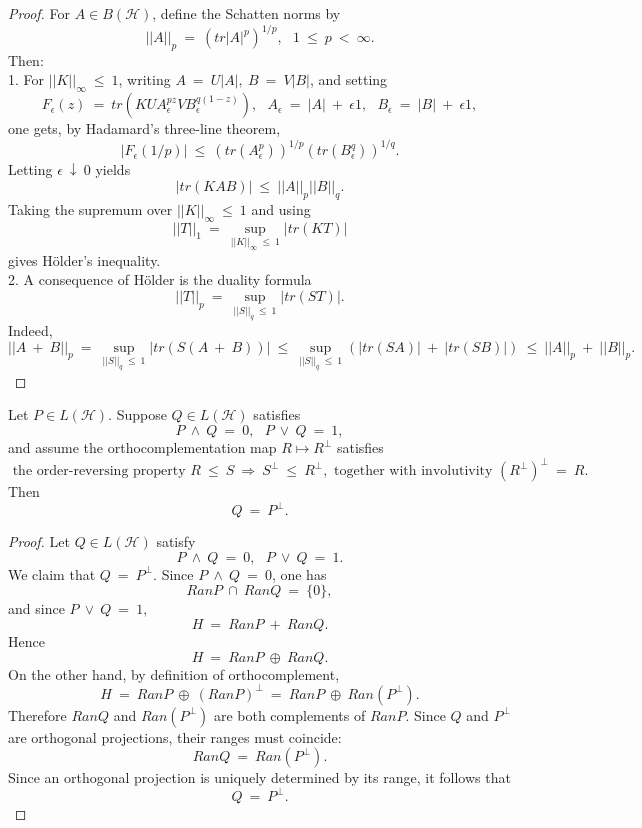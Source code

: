 \documentclass[11pt,a4paper]{article}
\begin{document}
    \vspace{0.3cm} %
    \begin{proof}
    For $A \in B(\mathcal{H})$, define the Schatten norms by $$||A||_p\ =\ (tr|A|^p)^{1/p},\ \ \ 1\ \leq\ p\ <\ \infty.$$ Then:\\
    1. For $||K||_\infty\ \leq\ 1$, writing $A\ =\ U|A|,\ B\ =\ V|B|$, and setting $$F_\epsilon(z)\ =\ tr(KUA_\epsilon^{pz}VB_\epsilon^{q(1-z)}),\ \ \ A_\epsilon\ =\ |A|\ +\ \epsilon1,\ \ \ B_\epsilon\ =\ |B|\ +\ \epsilon1,$$ one gets, by Hadamard's three-line theorem, $$|F_\epsilon(1/p)|\ \leq\ (tr(A_\epsilon^p))^{1/p}(tr(B_\epsilon^q))^{1/q}.$$ Letting $\epsilon\ \downarrow\ 0$ yields $$|tr(KAB)|\ \leq\ ||A||_p||B||_q.$$ Taking the supremum over $||K||_\infty\ \leq\ 1$ and using $$||T||_1\ =\ \sup_{||K||_\infty\ \leq\ 1} |tr(KT)|$$ gives H\"older's inequality.\\
    2. A consequence of H\"older is the duality formula $$||T||_p\ =\ \sup_{||S||_q\ \leq\ 1}|tr(ST)|.$$ Indeed, $$||A\ +\ B||_p\ =\ \sup_{||S||_q\ \leq\ 1}|tr(S(A\ +\ B))|\ \leq\ \sup_{||S||_q\ \leq\ 1}(|tr(SA)|\ +\ |tr(SB)|)\ \leq\ ||A||_p\ +\ ||B||_p.$$
    \end{proof}
    \vspace{0.3cm} %
    \pagebreak
    \begin{proposition}
    Let $P \in L(\mathcal{H})$. Suppose $Q \in L(\mathcal{H})$ satisfies $$P\ \wedge\ Q\ =\ 0,\ \ \ P\ \vee\ Q\ =\ 1,$$ and assume the orthocomplementation map $R \mapsto R^{\perp}$ satisfies $$\text{ the order-reversing property } R\ \leq\ S\ \Rightarrow\ S^{\perp}\ \leq\ R^{\perp}, \text{ together with involutivity } (R^{\perp})^{\perp}\ =\ R.$$ Then $$Q\ =\ P^{\perp}.$$
    \end{proposition}
    \vspace{0.3cm} %
    \begin{proof}
    Let $Q \in L(\mathcal{H})$ satisfy $$P\ \wedge\ Q\ =\ 0,\ \ \ P\ \vee\ Q\ =\ 1.$$ We claim that $Q\ =\ P^{\perp}$. Since $P\ \wedge\ Q\ =\ 0$, one has $$RanP\ \cap\ RanQ\ =\ \{0\},$$ and since $P\ \vee\ Q\ =\ 1,$ $$H\ =\ RanP\ +\ RanQ.$$ Hence $$H\ =\ RanP\ \oplus\ RanQ.$$ On the other hand, by definition of orthocomplement, $$H\ =\ RanP\ \oplus\ (RanP)^{\perp}\ =\ RanP\ \oplus\ Ran(P^{\perp}).$$ Therefore $RanQ$ and $Ran(P^{\perp})$ are both complements of $RanP$. Since $Q$ and $P^{\perp}$ are orthogonal projections, their ranges must coincide: $$RanQ\ =\ Ran(P^{\perp}).$$ Since an orthogonal projection is uniquely determined by its range, it follows that $$Q\ =\ P^{\perp}.$$
    \end{proof}
\end{document}
